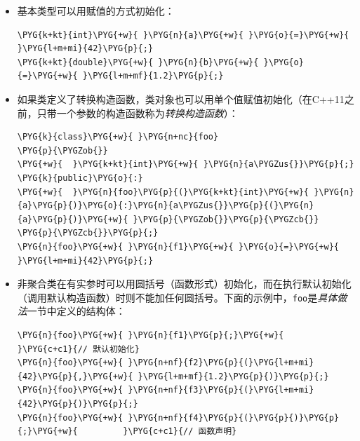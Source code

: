 \begin{itemize}
\item 基本类型可以用赋值的方式初始化：



\begin{codeblockbg}
\begin{Verbatim}[commandchars=\\\{\},breaklines=true,breakanywhere=true,fontsize=\codefont,xleftmargin=17bp]
\PYG{k+kt}{int}\PYG{+w}{ }\PYG{n}{a}\PYG{+w}{ }\PYG{o}{=}\PYG{+w}{ }\PYG{l+m+mi}{42}\PYG{p}{;}
\PYG{k+kt}{double}\PYG{+w}{ }\PYG{n}{b}\PYG{+w}{ }\PYG{o}{=}\PYG{+w}{ }\PYG{l+m+mf}{1.2}\PYG{p}{;}
\end{Verbatim}
\end{codeblockbg}



\item 如果类定义了转换构造函数，类对象也可以用单个值赋值初始化（在C++11之前，只带一个参数的构造函数称为\textit{转换构造函数}）：



\begin{codeblockbg}
\begin{Verbatim}[commandchars=\\\{\},breaklines=true,breakanywhere=true,fontsize=\codefont,xleftmargin=17bp]
\PYG{k}{class}\PYG{+w}{ }\PYG{n+nc}{foo}
\PYG{p}{\PYGZob{}}
\PYG{+w}{  }\PYG{k+kt}{int}\PYG{+w}{ }\PYG{n}{a\PYGZus{}}\PYG{p}{;}
\PYG{k}{public}\PYG{o}{:}
\PYG{+w}{  }\PYG{n}{foo}\PYG{p}{(}\PYG{k+kt}{int}\PYG{+w}{ }\PYG{n}{a}\PYG{p}{)}\PYG{o}{:}\PYG{n}{a\PYGZus{}}\PYG{p}{(}\PYG{n}{a}\PYG{p}{)}\PYG{+w}{ }\PYG{p}{\PYGZob{}}\PYG{p}{\PYGZcb{}}
\PYG{p}{\PYGZcb{}}\PYG{p}{;}
\PYG{n}{foo}\PYG{+w}{ }\PYG{n}{f1}\PYG{+w}{ }\PYG{o}{=}\PYG{+w}{ }\PYG{l+m+mi}{42}\PYG{p}{;}
\end{Verbatim}
\end{codeblockbg}



\item 非聚合类在有实参时可以用圆括号（函数形式）初始化，而在执行默认初始化（调用默认构造函数）时则不能加任何圆括号。下面的示例中，\texttt{foo}是\textit{具体做法}一节中定义的结构体：



\begin{codeblockbg}
\begin{Verbatim}[commandchars=\\\{\},breaklines=true,breakanywhere=true,fontsize=\codefont,xleftmargin=17bp]
\PYG{n}{foo}\PYG{+w}{ }\PYG{n}{f1}\PYG{p}{;}\PYG{+w}{           }\PYG{c+c1}{// 默认初始化}
\PYG{n}{foo}\PYG{+w}{ }\PYG{n+nf}{f2}\PYG{p}{(}\PYG{l+m+mi}{42}\PYG{p}{,}\PYG{+w}{ }\PYG{l+m+mf}{1.2}\PYG{p}{)}\PYG{p}{;}
\PYG{n}{foo}\PYG{+w}{ }\PYG{n+nf}{f3}\PYG{p}{(}\PYG{l+m+mi}{42}\PYG{p}{)}\PYG{p}{;}
\PYG{n}{foo}\PYG{+w}{ }\PYG{n+nf}{f4}\PYG{p}{(}\PYG{p}{)}\PYG{p}{;}\PYG{+w}{         }\PYG{c+c1}{// 函数声明}
\end{Verbatim}
\end{codeblockbg}



\end{itemize}
